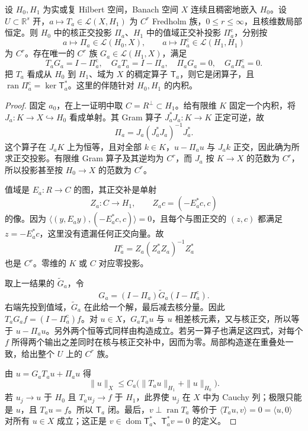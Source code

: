 \begin{theorem}\label{g3:thm:parameter-orthogonal-green}
	设 \(H_0,H_1\) 为实或复 Hilbert 空间，Banach 空间 \(X\) 连续且稠密地嵌入 \(H_0\)。设 \(U\subset\mathbb R^s\) 开，\(a\mapsto T_a\in\mathcal L(X,H_1)\) 为 \(C^r\) Fredholm 族，\(0\le r\le\infty\)，且核维数局部恒定。则 \(H_0\) 中的核正交投影 \(\Pi_a\)、\(H_1\) 中的值域正交补投影 \(\Pi_a^{\mathrm c}\)，分别按
	\[
		a\mapsto\Pi_a\in\mathcal L(H_0,X),\qquad
		a\mapsto\Pi_a^{\mathrm c}\in\mathcal L(H_1,H_1)
	\]
	为 \(C^r\)。存在唯一的 \(C^r\) 族 \(G_a\in\mathcal L(H_1,X)\)，满足
	\begin{equation}\label{g3:eq:parameter-orthogonal-green}
		T_aG_a=I-\Pi_a^{\mathrm c},\quad
		G_aT_a=I-\Pi_a,\quad
		\Pi_aG_a=0,\quad G_a\Pi_a^{\mathrm c}=0.
	\end{equation}
	把 \(T_a\) 看成从 \(H_0\) 到 \(H_1\)、域为 \(X\) 的稠定算子 \(\mathsf T_a\)，则它是闭算子，且
	\(\operatorname{ran}\Pi_a^{\mathrm c}=\ker\mathsf T_a^*\)。这里的伴随针对 \(H_0,H_1\) 的内积。
\end{theorem}
\begin{proof}
	固定 \(a_0\)，在上一证明中取 \(C=R^\perp\subset H_1\)。给有限维 \(K\) 固定一个内积，将 \(J_a:K\to X\hookrightarrow H_0\) 看成单射。其 Gram 算子 \(J_a^*J_a:K\to K\) 正定可逆，故
	\[
		\Pi_a=J_a(J_a^*J_a)^{-1}J_a^*.
	\]
	这个算子在 \(J_aK\) 上为恒等，且对全部 \(k\in K\)，\(u-\Pi_au\) 与 \(J_ak\) 正交，因此确为所求正交投影。有限维 Gram 算子及其逆均为 \(C^r\)，而 \(J_a\) 按 \(K\to X\) 的范数为 \(C^r\)，所以投影甚至按 \(H_0\to X\) 的范数为 \(C^r\)。

	值域是 \(E_a:R\to C\) 的图，其正交补是单射
	\[
		Z_a:C\to H_1,\qquad Z_ac=(-E_a^*c,c)
	\]
	的像。因为 \(\langle(y,E_ay),(-E_a^*c,c)\rangle=0\)，且每个与图正交的 \((z,c)\) 都满足 \(z=-E_a^*c\)，这里没有遗漏任何正交向量。故
	\[
		\Pi_a^{\mathrm c}=Z_a(Z_a^*Z_a)^{-1}Z_a^*
	\]
	也是 \(C^r\)。零维的 \(K\) 或 \(C\) 对应零投影。

	取上一结果的 \(\widetilde G_a\)，令
	\[
		G_a=(I-\Pi_a)\widetilde G_a(I-\Pi_a^{\mathrm c}).
	\]
	右端先投到值域，\(\widetilde G_a\) 在此给一个解，最后减去核分量。因此 \(T_aG_af=(I-\Pi_a^{\mathrm c})f\)。对 \(u\in X\)，\(G_aT_au\) 与 \(u\) 相差核元素，又与核正交，所以等于 \(u-\Pi_au\)。另外两个恒等式同样由构造成立。若另一算子也满足这四式，对每个 \(f\) 所得两个输出之差同时在核与核正交补中，因而为零。局部构造遂在重叠处一致，给出整个 \(U\) 上的 \(C^r\) 族。

	由 \(u=G_aT_au+\Pi_au\) 得
	\[
		\|u\|_X\le C_a\bigl(\|T_au\|_{H_1}+\|u\|_{H_0}\bigr).
	\]
	若 \(u_j\to u\) 于 \(H_0\) 且 \(T_au_j\to f\) 于 \(H_1\)，此界使 \(u_j\) 在 \(X\) 中为 Cauchy 列；极限只能是 \(u\)，且 \(T_au=f\)。所以 \(\mathsf T_a\) 闭。最后，\(v\perp\operatorname{ran}T_a\) 等价于
	\(\langle T_au,v\rangle=0=\langle u,0\rangle\) 对所有 \(u\in X\) 成立；这正是 \(v\in\operatorname{dom}\mathsf T_a^*\)、\(\mathsf T_a^*v=0\) 的定义。
\end{proof}

